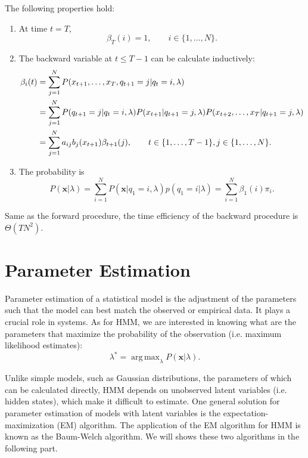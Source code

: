 \documentclass[12pt,final,twoside]{report}
\theoremstyle{plain}
\theoremstyle{definition}
\theoremstyle{remark}
\DeclareMathOperator*{\argmax}{arg\,max}
\begin{document}
The following properties hold:
\begin{enumerate}
  \item At time $t = T$,
    \begin{equation}
      \beta_T(i) = 1, \qquad i \in \{1,\dots,N\} .
    \end{equation}
  \item The backward variable at $t \leq T - 1$ can be calculate inductively:
    \begin{align}
      \beta_i(t) &= \sum_{j=1}^{N} P(x_{t+1},\dots,x_T,q_{t+1}=j|q_t=i,\lambda) \notag\\
      &= \sum_{j=1}^{N} P(q_{t+1}=j|q_t=i,\lambda) P(x_{t+1}|q_{t+1}=j,\lambda) P(x_{t+2},\dots,x_T|q_{t+1}=j,\lambda) \notag\\
      &= \sum_{j=1}^{N} a_{ij} b_j(x_{t+1}) \beta_{t+1}(j) , \qquad t \in \{1,\dots,T - 1\}, j \in \{1,\dots,N\} .
    \end{align}
  \item The probability is
    \begin{equation}
      P(\mathbf{x}|\lambda) = \sum_{i=1}^N P(\mathbf{x}|q_1=i,\lambda) p(q_1=i|\lambda) = \sum_{i=1}^N \beta_1(i) \pi_i .
    \end{equation}
\end{enumerate}

Same as the forward procedure, the time efficiency of the backward procedure is $\Theta(TN^2)$.

\section{Parameter Estimation}
Parameter estimation of a statistical model is the adjustment of the parameters such that the model can best match the observed or empirical data. It plays a crucial role in systems. As for HMM, we are interested in knowing what are the parameters that maximize the probability of the observation (i.e. maximum likelihood estimates):
\begin{equation}
  \lambda^* = \argmax_{\lambda} P(\mathbf{x}|\lambda) .
\end{equation}

Unlike simple models, such as Gaussian distributions, the parameters of which can be calculated directly, HMM depends on unobserved latent variables (i.e. hidden states), which make it difficult to estimate. One general solution for parameter estimation of models with latent variables is the expectation-maximization (EM) algorithm. The application of the EM algorithm for HMM is known as the Baum-Welch algorithm. We will shows these two algorithms in the following part.
\end{document}
